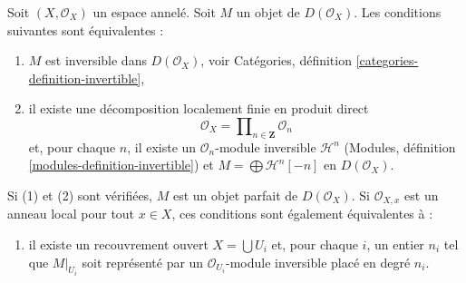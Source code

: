 \begin{lemma}

\label{lemma-invertible-derived}

Soit $(X, \mathcal{O}_X)$ un espace annelé. Soit $M$ un objet de $D(\mathcal{O}_X)$. Les conditions suivantes sont équivalentes :

\begin{enumerate}

\item  $M$ est inversible dans $D(\mathcal{O}_X)$, voir Catégories, définition \ref{categories-definition-invertible},
\item il existe une décomposition localement finie en produit direct
$$
\mathcal{O}_X = \prod\nolimits_{n \in \mathbf{Z}} \mathcal{O}_n
$$
et, pour chaque $n$, il existe un $\mathcal{O}_n$-module inversible
$\mathcal{H}^n$ (Modules, définition \ref{modules-definition-invertible}) et $M = \bigoplus \mathcal{H}^n[-n]$ en $D(\mathcal{O}_X)$.

\end{enumerate}

Si (1) et (2) sont vérifiées, $M$ est un objet parfait de $D(\mathcal{O}_X)$. Si
$\mathcal{O}_{X, x}$ est un anneau local pour tout $x \in X$, ces conditions sont également équivalentes à :

\begin{enumerate}

\item[(3)] il existe un recouvrement ouvert $X = \bigcup U_i$
et, pour chaque $i$, un entier $n_i$ tel que $M|_{U_i}$
soit représenté par un $\mathcal{O}_{U_i}$-module inversible placé en degré $n_i$.

\end{enumerate}

\end{lemma}

